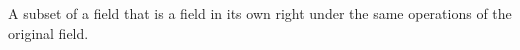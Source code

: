 A subset of a field that is a field in its own
right under the same operations of the original field.


